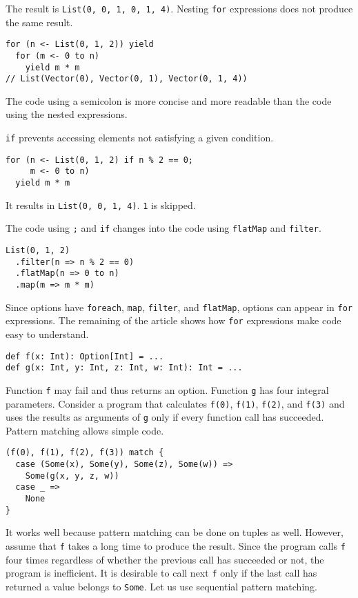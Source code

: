 The result is \verb!List(0, 0, 1, 0, 1, 4)!. Nesting \verb!for! expressions does
not produce the same result.

\begin{verbatim}
for (n <- List(0, 1, 2)) yield
  for (m <- 0 to n)
    yield m * m
// List(Vector(0), Vector(0, 1), Vector(0, 1, 4))
\end{verbatim}

The code using a semicolon is more concise and more readable than the code using
the nested expressions.

\verb!if! prevents accessing elements not satisfying a given condition.

\begin{verbatim}
for (n <- List(0, 1, 2) if n % 2 == 0;
     m <- 0 to n)
  yield m * m
\end{verbatim}

It results in \verb!List(0, 0, 1, 4)!. \verb!1! is skipped.

The code using \verb!;! and \verb!if! changes into the code using \verb!flatMap!
and \verb!filter!.

\begin{verbatim}
List(0, 1, 2)
  .filter(n => n % 2 == 0)
  .flatMap(n => 0 to n)
  .map(m => m * m)
\end{verbatim}

Since options have \verb!foreach!, \verb!map!, \verb!filter!, and \verb!flatMap!,
options can appear in \verb!for! expressions. The remaining of the article shows
how \verb!for! expressions make code easy to understand.

\begin{verbatim}
def f(x: Int): Option[Int] = ...
def g(x: Int, y: Int, z: Int, w: Int): Int = ...
\end{verbatim}

Function \verb!f! may fail and thus returns an option. Function \verb!g! has four
integral parameters. Consider a program that calculates \verb!f(0)!, \verb!f(1)!,
\verb!f(2)!, and \verb!f(3)! and uses the results as arguments of \verb!g! only
if every function call has succeeded. Pattern matching allows simple code.

\begin{verbatim}
(f(0), f(1), f(2), f(3)) match {
  case (Some(x), Some(y), Some(z), Some(w)) =>
    Some(g(x, y, z, w))
  case _ =>
    None
}
\end{verbatim}

It works well because pattern matching can be done on tuples as well. However,
assume that \verb!f! takes a long time to produce the result. Since the program
calls \verb!f! four times regardless of whether the previous call has succeeded
or not, the program is inefficient. It is desirable to call next \verb!f! only if
the last call has returned a value belongs to \verb!Some!. Let us use sequential
pattern matching.

